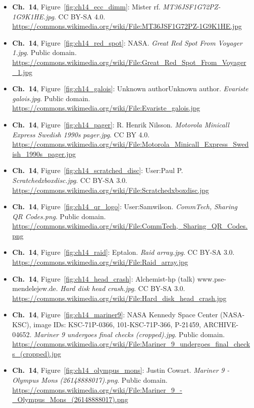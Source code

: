 \begin{small}
\begin{itemize}[leftmargin=0pt,itemsep=2pt,label={}]
\item \textbf{Ch.~14}, Figure~\ref{fig:ch14_ecc_dimm}: Mister rf. \emph{MT36JSF1G72PZ-\allowbreak{}1G9K1HE.\allowbreak{}jpg}. CC BY-SA 4.0. \url{https://commons.wikimedia.org/wiki/File:MT36JSF1G72PZ-1G9K1HE.jpg}
\item \textbf{Ch.~14}, Figure~\ref{fig:ch14_red_spot}: NASA. \emph{Great Red Spot From Voyager 1.\allowbreak{}jpg}. Public domain. \url{https://commons.wikimedia.org/wiki/File:Great_Red_Spot_From_Voyager_1.jpg}
\item \textbf{Ch.~14}, Figure~\ref{fig:ch14_galois}: Unknown authorUnknown author. \emph{Evariste galois.\allowbreak{}jpg}. Public domain. \url{https://commons.wikimedia.org/wiki/File:Evariste_galois.jpg}
\item \textbf{Ch.~14}, Figure~\ref{fig:ch14_pager}: R. Henrik Nilsson. \emph{Motorola Minicall Express Swedish 1990s pager.\allowbreak{}jpg}. CC BY 4.0. \url{https://commons.wikimedia.org/wiki/File:Motorola_Minicall_Express_Swedish_1990s_pager.jpg}
\item \textbf{Ch.~14}, Figure~\ref{fig:ch14_scratched_disc}: User:Paul P. \emph{Scratchedxboxdisc.\allowbreak{}jpg}. CC BY-SA 3.0. \url{https://commons.wikimedia.org/wiki/File:Scratchedxboxdisc.jpg}
\item \textbf{Ch.~14}, Figure~\ref{fig:ch14_qr_logo}: User:Samwilson. \emph{CommTech, Sharing QR Codes.\allowbreak{}png}. Public domain. \url{https://commons.wikimedia.org/wiki/File:CommTech,_Sharing_QR_Codes.png}
\item \textbf{Ch.~14}, Figure~\ref{fig:ch14_raid}: Eptalon. \emph{Raid array.\allowbreak{}jpg}. CC BY-SA 3.0. \url{https://commons.wikimedia.org/wiki/File:Raid_array.jpg}
\item \textbf{Ch.~14}, Figure~\ref{fig:ch14_head_crash}: Alchemist-hp (talk) www.pse-mendelejew.de. \emph{Hard disk head crash.\allowbreak{}jpg}. CC BY-SA 3.0. \url{https://commons.wikimedia.org/wiki/File:Hard_disk_head_crash.jpg}
\item \textbf{Ch.~14}, Figure~\ref{fig:ch14_mariner9}: NASA Kennedy Space Center (NASA-KSC), image IDs: KSC-71P-0366, 101-KSC-71P-366, P-21459, ARCHIVE-04652. \emph{Mariner 9 undergoes final checks (cropped).\allowbreak{}jpg}. Public domain. \url{https://commons.wikimedia.org/wiki/File:Mariner_9_undergoes_final_checks_(cropped).jpg}
\item \textbf{Ch.~14}, Figure~\ref{fig:ch14_olympus_mons}: Justin Cowart. \emph{Mariner 9 -\allowbreak{} Olympus Mons (26148888017).\allowbreak{}png}. Public domain. \url{https://commons.wikimedia.org/wiki/File:Mariner_9_-_Olympus_Mons_(26148888017).png}

\end{itemize}
\end{small}
